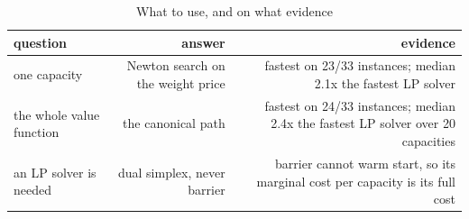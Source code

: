 \begin{table}[tbp]
\centering
\caption{What to use, and on what evidence}
\label{tab:recommendation}
\begin{tabular}{lrr}
\toprule
question & answer & evidence \\
\midrule
one capacity & Newton search on the weight price & fastest on 23/33 instances; median 2.1x the fastest LP solver \\
the whole value function & the canonical path & fastest on 24/33 instances; median 2.4x the fastest LP solver over 20 capacities \\
an LP solver is needed & dual simplex, never barrier & barrier cannot warm start, so its marginal cost per capacity is its full cost \\
\bottomrule
\end{tabular}
\end{table}
